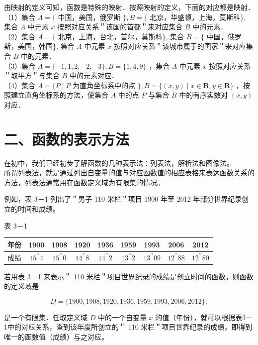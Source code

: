 \documentclass[10pt]{article}
\begin{document}
由映射的定义可知，函数是特殊的映射．按照映射的定义，下面的对应都是映射．\\
（1）集合 \(A=\{\) 中国，美国，俄罗斯 \(\}, B=\{\) 北京，华盛顿，上海，莫斯科\}, 集合 \(A\) 中元素 \(x\) 按照对应关系＂该国的首都＂来对应集合 \(B\) 中的元素．\\
（2）集合 \(A=\{\) 北京，上海，台北，首尔，莫斯科\}, 集合 \(B=\{\) 中国，俄罗斯，美国，韩国\}, 集合 \(A\) 中元素 \(x\) 按照对应关系＂该城市属于的国家＂来对应集合 \(B\) 中的元素．\\
（3）集合 \(A=\{-1,1,2,-2,-3\}, B=\{1,4,9\}\) ，集合 \(A\) 中元素 \(x\) 按照对应关系＂取平方＂与集合 \(B\) 中的元素对应．\\
（4）集合 \(A=\{P \mid P\) 为直角坐标系中的点 \(\}, B=\{(x, y) \mid x \in \mathbf{R}, y \in \mathbf{R}\}\) ，按照建立直角坐标系的方法，使集合 \(A\) 中的点 \(P\) 与集合 \(B\) 中的有序实数对 \((x, y)\) 对应．

\section*{二、函数的表示方法}
在初中，我们已经初步了解函数的几种表示法：列表法，解析法和图像法。\\
所谓列表法，就是通过列出自变量的值与对应函数值的相应表格来表达函数关系的方法，列表法通常用在函数定义域为有限集的情况。

例如，表 3－1 列出了＂男子 110 米栏＂项目 1900 年至 2012 年部分世界纪录创立的时间和成绩。

表 3－1

\begin{center}
\begin{tabular}{|c|c|c|c|c|c|c|c|c|}
\hline
年份 & 1900 & 1908 & 1920 & 1936 & 1959 & 1993 & 2006 & 2012 \\
\hline
成绩 & \(15^{\prime \prime} 4\) & \(15^{\prime \prime} 0\) & \(14^{\prime \prime} 8\) & \(14^{\prime \prime} 2\) & \(13^{\prime \prime} 2\) & \(13^{\prime \prime} 09\) & \(12^{\prime \prime} 88\) & \(12^{\prime \prime} 80\) \\
\hline
\end{tabular}
\end{center}

若用表 3－1 来表示＂ 110 米栏＂项目世界纪录的成绩是创立时间的函数，则函数的定义域是

\[
D=\{1900,1908,1920,1936,1959,1993,2006,2012\},
\]

是一个有限集．任取定义域 \(D\) 中的一个自变量 \(x\) 的值（年份），就可以根据表3－1中的对应关系，查到该年度所创立的＂ 110 米栏＂项目世界纪录的成绩，即得到唯一的函数值（成绩）与之对应。
\end{document}
